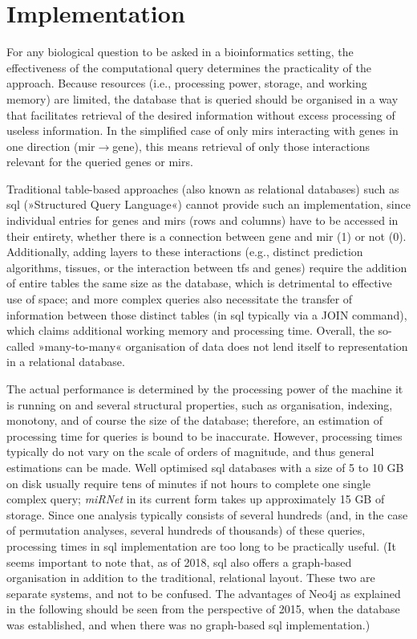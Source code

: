 \section{Implementation}
For any biological question to be asked in a bioinformatics setting, the effectiveness of the computational query determines the practicality of the approach. Because resources (i.e., processing power, storage, and working memory) are limited, the database that is queried should be organised in a way that facilitates retrieval of the desired information without excess processing of useless information. In the simplified case of only \acp{mir} interacting with genes in one direction (\ac{mir}$\to$gene), this means retrieval of only those interactions relevant for the queried genes or \acp{mir}. 

Traditional table-based approaches (also known as relational databases) such as \acs{sql}  (»Structured Query Language«) cannot provide such an implementation, since individual entries for genes and \acp{mir} (rows and columns) have to be accessed in their entirety, whether there is a connection between gene and \ac{mir} (1) or not (0). Additionally, adding layers to these interactions (e.g., distinct prediction algorithms, tissues, or the interaction between \acp{tf} and genes) require the addition of entire tables the same size as the database, which is detrimental to effective use of space; and more complex queries also necessitate the transfer of information between those distinct tables (in \ac{sql} typically via a \textcolor{dkblue}{JOIN} command), which claims additional working memory and processing time. Overall, the so-called »many-to-many« organisation of data does not lend itself to representation in a relational database. 


The actual performance is determined by the processing power of the machine it is running on and several structural properties, such as organisation, indexing, monotony, and of course the size of the database; therefore, an estimation of processing time for queries is bound to be inaccurate. However, processing times typically do not vary on the scale of orders of magnitude, and thus general estimations can be made. Well optimised \ac{sql} databases with a size of 5 to 10 GB on disk usually require tens of minutes if not hours to complete one single complex query\cite{Chaudhuri2004}; \textit{miRNet} in its current form takes up approximately 15 GB of storage. Since one analysis typically consists of several hundreds (and, in the case of permutation analyses, several hundreds of thousands) of these queries, processing times in \ac{sql} implementation are too long to be practically useful. (It seems important to note that, as of 2018, \ac{sql} also offers a graph-based organisation in addition to the traditional, relational layout. These two are separate systems, and not to be confused. The advantages of Neo4j as explained in the following should be seen from the perspective of 2015, when the database was established, and when there was no graph-based \ac{sql} implementation.)

